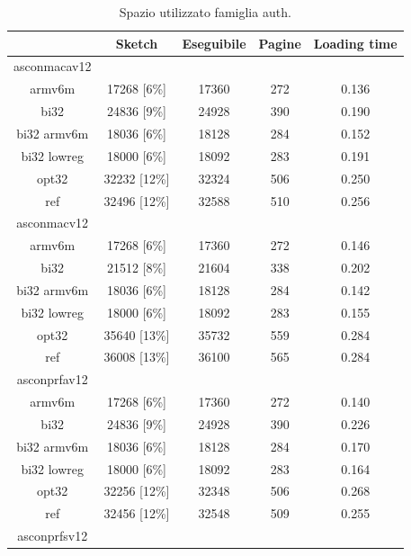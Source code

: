 \documentclass[12pt,a4paper,italian]{report}
\begin{document}
\begin{table}[h]
    \caption{Spazio utilizzato famiglia auth.}
    \centering
	\begin{tabular}{|c|c|c|c|c|}
		\hline
         & Sketch & Eseguibile & Pagine & Loading time \\
        \hline
        asconmacav12 & & & & \\
        \hline
        armv6m & 17268 [6\%] & 17360 & 272 & 0.136 \\
        \hline
        bi32 & 24836 [9\%] & 24928 & 390 & 0.190 \\
        \hline
        bi32 armv6m & 18036 [6\%] & 18128 & 284 & 0.152 \\
        \hline
        bi32 lowreg & 18000 [6\%] & 18092 & 283 & 0.191 \\
        \hline
        opt32 & 32232 [12\%] & 32324 & 506 & 0.250 \\
        \hline
        ref & 32496 [12\%] & 32588 & 510 & 0.256 \\
        \hline
        asconmacv12 & & & & \\
        \hline
        armv6m & 17268 [6\%] & 17360 & 272 & 0.146 \\
        \hline
        bi32 & 21512 [8\%] & 21604 & 338 & 0.202 \\
        \hline
        bi32 armv6m & 18036 [6\%] & 18128 & 284 & 0.142 \\
        \hline
        bi32 lowreg & 18000 [6\%] & 18092 & 283 & 0.155 \\
        \hline
        opt32 & 35640 [13\%] & 35732 & 559 & 0.284 \\
        \hline
        ref & 36008 [13\%] & 36100 & 565 & 0.284 \\
        \hline
        asconprfav12 & & & & \\
        \hline
        armv6m & 17268 [6\%] & 17360 & 272 & 0.140 \\
        \hline
        bi32 & 24836 [9\%] & 24928 & 390 & 0.226 \\
        \hline
        bi32 armv6m & 18036 [6\%] & 18128 & 284 & 0.170 \\
        \hline
        bi32 lowreg & 18000 [6\%] & 18092 & 283 & 0.164 \\
        \hline
        opt32 & 32256 [12\%] & 32348 & 506 & 0.268 \\
        \hline
        ref & 32456 [12\%] & 32548 & 509 & 0.255 \\
        \hline
        asconprfsv12 & & & & \\

\end{tabular}
\end{table}
\end{document}
